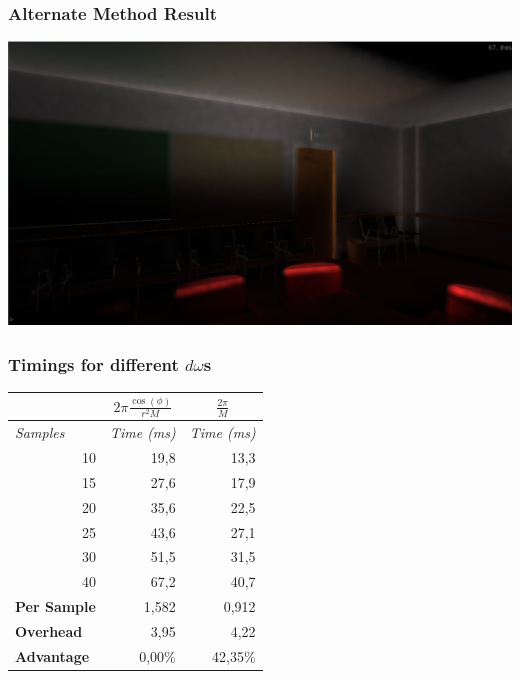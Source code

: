 \documentclass{beamer}
\begin{document}
\begin{frame}
\frametitle{Alternate Method Result}
\begin{center}
\includegraphics[scale=0.3]{img/newdomega}
\end{center}
\end{frame}

\begin{frame}
\frametitle{Timings for different $d\omega$s}
\begin{center}
\begin{tabular}{|r|r|r|}
\hline
\multicolumn{1}{|l|}{} & \multicolumn{1}{c|}{$2\pi \frac{\cos(\phi)}{r^2 M}$} & \multicolumn{1}{c|}{$\frac{2\pi}{M}$} \\ \hline
\multicolumn{1}{|l|}{\textit{Samples}} & \multicolumn{1}{l|}{\textit{Time (ms)}} & \multicolumn{1}{l|}{\textit{Time (ms)}} \\ \hline
10 & 19,8 & 13,3 \\ \hline
15 & 27,6 & 17,9 \\ \hline
20 & 35,6 & 22,5 \\ \hline
25 & 43,6 & 27,1 \\ \hline
30 & 51,5 & 31,5 \\ \hline
40 & 67,2 & 40,7 \\ \hline
\multicolumn{1}{|l|}{\textbf{Per Sample}} & 1,582 & 0,912 \\ \hline
\multicolumn{1}{|l|}{\textbf{Overhead}} & 3,95 & 4,22 \\ \hline
\multicolumn{1}{|l|}{\textbf{Advantage}} & 0,00\% & 42,35\% \\ \hline
\end{tabular}
\end{center}
\end{frame}
\end{document}
